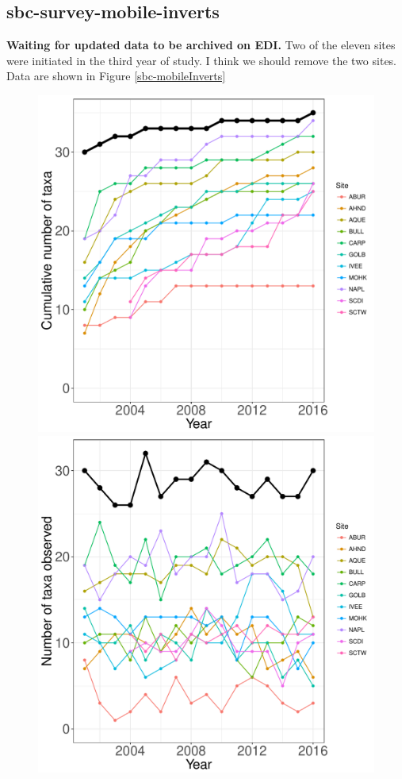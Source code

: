 \documentclass[11pt, oneside]{article}
\begin{document}
\subsection {sbc-survey-mobile-inverts}
{\bf Waiting for updated data to be archived on EDI.}
Two of the eleven sites were initiated in the third year of study.
I think we should remove the two sites.
Data are shown in Figure \ref{sbc-mobileInverts}
\begin{figure}[h!]
\centering
\includegraphics[scale = 0.4]{sbc-mobileInverts-castorani_species_accumulation_curve.pdf}
\includegraphics[scale = 0.4]{sbc-mobileInverts-castorani_num_taxa_over_time.pdf}

\end{figure}
\end{document}
